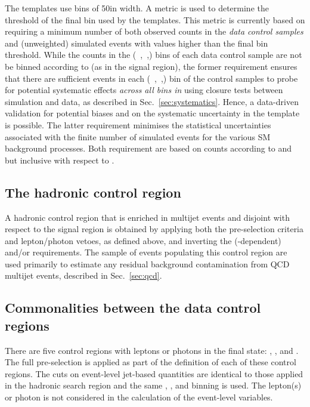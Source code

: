 The templates use \mht bins of 50\gev in width. A metric is used to
determine the threshold of the final \mht bin used by the
templates. This metric is currently based on requiring a minimum
number of both observed counts in the {\it data control samples} and
(unweighted) simulated events with \mht values higher than the final
bin threshold. While the counts in the (\njet~,\nb~,\HT) bins of each
data control sample are not be binned according to \mht (as in the
signal region), the former requirement ensures that there are
sufficient events in each (\njet~,\nb~,\HT) bin of the control samples
to probe for potential systematic effects {\it across all bins in
  \mht} using closure tests between simulation and data, as described
in Sec.~\ref{sec:systematics}. Hence, a data-driven validation for
potential biases and on the systematic uncertainty in the \mht
template is possible. The latter requirement minimises the statistical
uncertainties associated with the finite number of simulated events
for the various SM background processes. Both requirement are based on
counts according to \njet and \nb but inclusive with respect to \nb.

\subsection{The hadronic control region}

A hadronic control region that is enriched in multijet events and
disjoint with respect to the signal region is obtained by applying
both the pre-selection criteria and lepton/photon vetoes, as defined
above, and inverting the (\HT-dependent) \alphat and/or \mhtmet
requirements. 
The sample of events populating this control region are used primarily
to estimate any residual background contamination from QCD multijet
events, described in Sec.~\ref{sec:qcd}.

\subsection{Commonalities between the data control regions}

There are five control regions with leptons or photons in the final
state: \mj, \mmj, and \gj. 
The full pre-selection is applied as part of the definition of each of these control
regions. The cuts on event-level jet-based quantities are identical to
those applied in the hadronic search region and the same \njet, \nb,
and \scalht binning is used. The lepton(s) or photon is not considered
in the calculation of the event-level variables.

